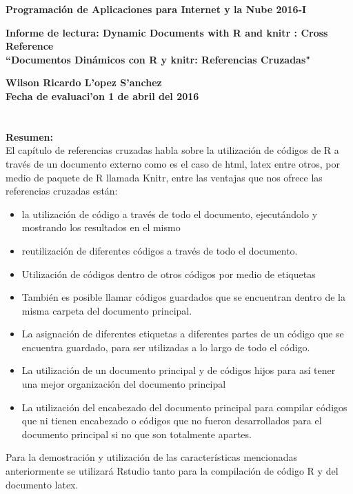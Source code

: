 \documentclass[10pt]{article}\usepackage[]{graphicx}\usepackage[]{color}
\begin{document}
	
\begin{center}
	{\Large \textbf{Programaci\'{o}n de Aplicaciones para Internet y la Nube  \hspace{1cm}	2016-I}}\\
\end{center}

	\begin{flushright}
		{\large \textbf{Informe de lectura: Dynamic Documents with R and knitr : Cross Reference\\
		``Documentos Dinámicos con R y knitr: Referencias Cruzadas"}}
		
	\end{flushright}
	\textbf{Wilson Ricardo L'opez S'anchez\\	
	Fecha de evaluaci'on 1 de abril del 2016\\}\\
\\


  \textbf{Resumen:}
\\	
	
	El capítulo de referencias cruzadas habla sobre la utilización de códigos de R a través de un documento externo como es el caso de html, latex entre otros, por medio de paquete de R llamada Knitr, entre las ventajas que nos ofrece las referencias cruzadas están:
	
	\begin{itemize}
		
		
	
\item	la utilización de código a través de todo el documento, ejecutándolo y mostrando los resultados en el mismo 

\item	reutilización de diferentes códigos a través de todo el documento.

\item	Utilización de códigos dentro de otros códigos por medio de etiquetas

\item	También es posible llamar códigos guardados que se encuentran dentro de la misma carpeta del documento principal.

\item	La asignación de diferentes etiquetas a diferentes partes de un código que se encuentra guardado, para ser utilizadas a lo largo de todo el código.

\item	La utilización de un documento principal y de códigos hijos para así tener una mejor organización del documento principal 

\item	La utilización del encabezado del documento principal para compilar códigos que ni tienen encabezado o códigos que no fueron desarrollados para el documento principal si no que son totalmente apartes.

\end{itemize}
Para la demostración y utilización de las características mencionadas anteriormente se utilizará Rstudio tanto para la compilación de código R y del documento latex. 
\\
\\
	
\end{document}
